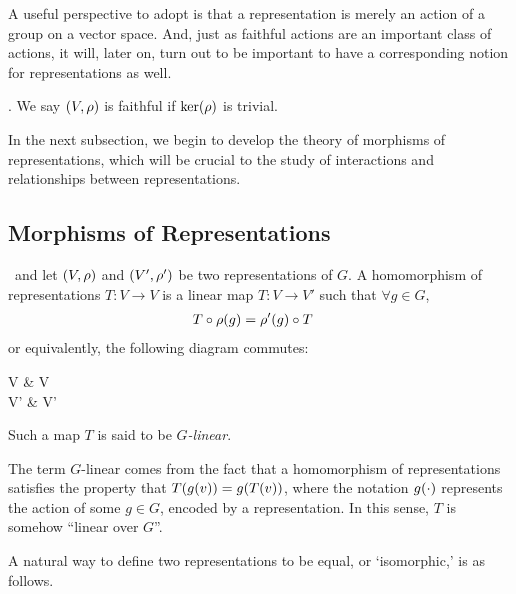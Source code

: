 A useful perspective to adopt is that a representation is merely an action of a group on a vector space. And, just as faithful actions are an important class of actions, it will, later on, turn out to be important to have a corresponding notion for representations as well.

\begin{definition}[Faithfulness] \label{Ch1:Def:Faithfulness}
    . We say $\left( V, \rho \right)$ is faithful if $\operatorname{ker}\!\left( \rho \right)$ is trivial.
\end{definition}

In the next subsection, we begin to develop the theory of morphisms of representations, which will be crucial to the study of interactions and relationships between representations.

\subsection{Morphisms of Representations}

\begin{boxdefinition}
    \ and let $\left( V,\rho \right)$ and $\left( V',\rho' \right)$ be two representations of $G$. A homomorphism of representations $T : V \to V$ is a linear map $T : V \to V'$ such that $\forall g \in G$,
    \begin{align}
        T \circ \rho\!\left( g \right) &= \rho'(g) \circ T
        \label{Ch1:Eq:Def_Rep_Morph}
    \end{align}
    or equivalently, the following diagram commutes:
    \begin{cd}
        V \arrow[r, "\rho(g)"] \arrow[d, "T"'] & V \arrow[d, "T"] \\
        V' \arrow[r, "\rho'(g)"'] & V'
        \label{Ch1:eq:cd_rep_map}
    \end{cd}
    Such a map $T$ is said to be \textit{$G$-linear}.
\end{boxdefinition}

\begin{remark}
    The term $G$-linear comes from the fact that a homomorphism of representations satisfies the property that $T\!\left( g(v) \right) = g\!\left( T\!\left( v \right) \right)$, where the notation $g\!\left( \cdot \right)$ represents the action of some $g \in G$, encoded by a representation. In this sense, $T$ is somehow ``linear over $G$''.
\end{remark}

A natural way to define two representations to be equal, or `isomorphic,' is as follows.

